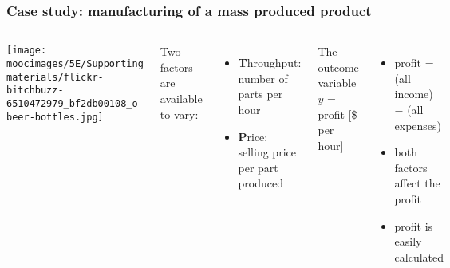 \documentclass[handout,11pt,aspectratio=169,mathserif]{beamer}
\begin{document}
\begin{frame}\frametitle{Case study: manufacturing of a mass produced product}
	\begin{columns}[c]
				\centerline{\texttt{[image: \\moocimages/5E/Supporting materials/flickr-bitchbuzz-6510472979\_bf2db00108\_o-beer-bottles.jpg]}}
			Two factors are available to vary:
			\begin{itemize}
				

				\item	\textbf{T}hroughput: number of parts per hour
				\item	\textbf{P}rice: selling price per part produced
			\end{itemize}
			
			\vspace{1cm}
			\pause
			The outcome variable $y$ = profit [\$ per hour]
			
			\begin{itemize}
				\item	profit = (all income) $-$ (all expenses) \pause
				\item	both factors affect the profit \pause
				\item	profit is easily calculated \pause
			\end{itemize}
	\end{columns}
\end{frame}
\end{document}
